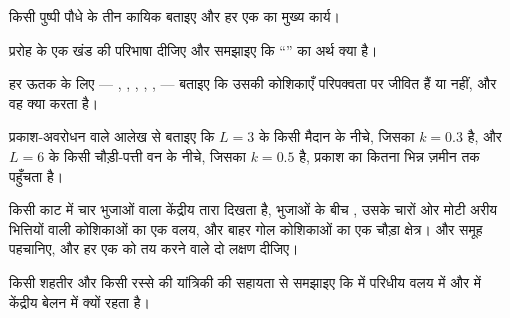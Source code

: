 \begin{exercise}[$\star$]\label{exo:b1:flowering-plant-organization:1}
किसी पुष्पी पौधे के तीन कायिक  बताइए और हर एक का मुख्य कार्य।
\end{exercise}

\begin{exercise}[$\star$]\label{exo:b1:flowering-plant-organization:2}
प्ररोह के एक खंड की परिभाषा दीजिए और समझाइए कि ``'' का
अर्थ क्या है।
\end{exercise}

\begin{exercise}[$\star$]\label{exo:b1:flowering-plant-organization:3}
हर ऊतक के लिए --- , , , , , 
--- बताइए कि उसकी कोशिकाएँ परिपक्वता पर जीवित हैं या नहीं, और वह क्या
करता है।
\end{exercise}

\begin{exercise}[$\star$]\label{exo:b1:flowering-plant-organization:4}
प्रकाश-अवरोधन वाले आलेख से बताइए कि $L = 3$ के किसी मैदान के नीचे,
जिसका $k = 0.3$ है, और $L = 6$ के किसी चौड़ी-पत्ती वन के नीचे, जिसका
$k = 0.5$ है, प्रकाश का कितना भिन्न ज़मीन तक पहुँचता है।
\end{exercise}

\begin{exercise}[$\star\star$]\label{exo:b1:flowering-plant-organization:5}
किसी काट में चार भुजाओं वाला केंद्रीय  तारा दिखता है, भुजाओं के
बीच , उसके चारों ओर मोटी अरीय भित्तियों वाली कोशिकाओं का एक वलय,
और बाहर गोल कोशिकाओं का एक चौड़ा क्षेत्र।  और समूह पहचानिए, और हर एक
को तय करने वाले दो लक्षण दीजिए।
\end{exercise}

\begin{exercise}[$\star\star$]\label{exo:b1:flowering-plant-organization:6}
किसी शहतीर और किसी रस्से की यांत्रिकी की सहायता से समझाइए कि 
 में परिधीय वलय में और  में केंद्रीय बेलन में क्यों रहता है।
\end{exercise}

